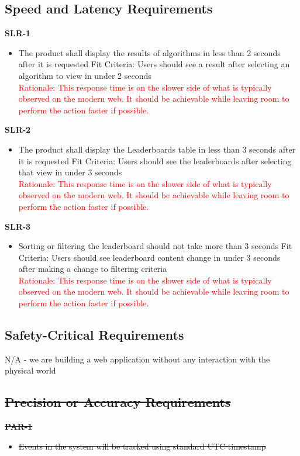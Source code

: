 \documentclass[12pt]{article}
\begin{document}
\subsection{Speed and Latency Requirements}
\textbf{SLR-1}
\begin{itemize}
\item The product shall display the results of algorithms in less than 2 seconds after it is requested \hfill \break
Fit Criteria: Users should see a result after selecting an algorithm to view in under 2 seconds \\
\textcolor{red} {Rationale: This response time is on the slower side of what is typically observed on the modern web. It should be achievable while leaving room to perform the action faster if possible.}
\end{itemize}
\textbf{SLR-2}
\begin{itemize}
\item The product shall display the Leaderboards table in less than 3 seconds after it is requested \hfill \break
Fit Criteria: Users should see the leaderboards after selecting that view in under 3 seconds \\
\textcolor{red} {Rationale: This response time is on the slower side of what is typically observed on the modern web. It should be achievable while leaving room to perform the action faster if possible.}
\end{itemize}
\textbf{SLR-3}
\begin{itemize}
\item Sorting or filtering the leaderboard should not take more than 3 seconds \hfill \break
Fit Criteria: Users should see leaderboard content change in under 3 seconds after making a change to filtering criteria \\
\textcolor{red} {Rationale: This response time is on the slower side of what is typically observed on the modern web. It should be achievable while leaving room to perform the action faster if possible.}
\end{itemize}


\subsection{Safety-Critical Requirements}
N/A - we are building a web application without any interaction with the physical world
\subsection{\sout{Precision or Accuracy Requirements}}
\textbf{\sout{PAR-1}}
\begin{itemize}
    \item \sout{Events in the system will be tracked using standard UTC timestamp}
\end{itemize}
\end{document}
